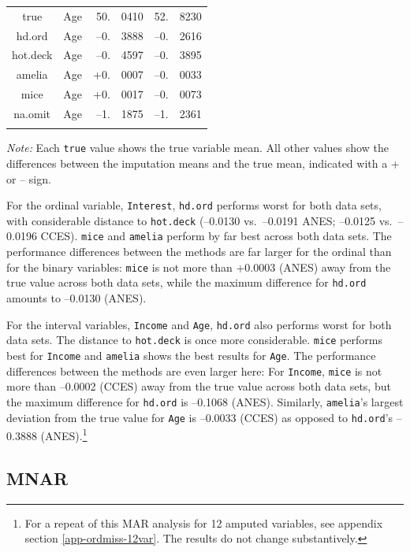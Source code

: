 \documentclass[12pt,econ]{sources/authesis}
\begin{document}
\begin{table}[!htbp]
\begin{threeparttable}
\begin{tabular}{ccr@{}lr@{}l}
 true & Age & 50.&0410 & 52.&8230 \\
 hd.ord & Age & --0.&3888 & --0.&2616 \\
 hot.deck & Age & --0.&4597 & --0.&3895 \\
 amelia & Age & +0.&0007 & --0.&0033 \\
 mice & Age & +0.&0017 & --0.&0073 \\
 na.omit & Age & --1.&1875 & --1.&2361 \\
 \hline \\[-1.8ex]  
\end{tabular} 
\begin{tablenotes}
\footnotesize{\textit{Note:} Each \texttt{true} value shows the true variable mean. All other values show the differences between the imputation means and the true mean, indicated with a + or -- sign.}
\end{tablenotes}
\end{threeparttable}
\end{table}
For the ordinal variable, \texttt{Interest}, \texttt{hd.ord} performs worst for both data sets, with considerable distance to \texttt{hot.deck} (--0.0130 vs.~--0.0191 ANES; --0.0125 vs.~--0.0196 CCES). \texttt{mice} and \texttt{amelia} perform by far best across both data sets. The performance differences between the methods are far larger for the ordinal than for the binary variables: \texttt{mice} is not more than +0.0003 (ANES) away from the true value across both data sets, while the maximum difference for \texttt{hd.ord} amounts to --0.0130 (ANES).

For the interval variables, \texttt{Income} and \texttt{Age}, \texttt{hd.ord} also performs worst for both data sets. The distance to \texttt{hot.deck} is once more considerable. \texttt{mice} performs best for \texttt{Income} and \texttt{amelia} shows the best results for \texttt{Age}. The performance differences between the methods are even larger here: For \texttt{Income}, \texttt{mice} is not more than --0.0002 (CCES) away from the true value across both data sets, but the maximum difference for \texttt{hd.ord} is --0.1068 (ANES). Similarly, \texttt{amelia}'s largest deviation from the true value for \texttt{Age} is --0.0033 (CCES) as opposed to \texttt{hd.ord}'s --0.3888 (ANES).\footnote{For a repeat of this MAR analysis for 12 amputed variables, see appendix section \ref{app-ordmiss-12var}. The results do not change substantively.}

\hypertarget{ordmiss-results-mnar}{%
\subsection{MNAR}\label{ordmiss-results-mnar}}
\end{document}
